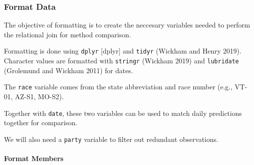 \documentclass[]{article}
\let\oldparagraph\paragraph
\renewcommand{\paragraph}[1]{\oldparagraph{#1}\mbox{}}
\begin{document}
\hypertarget{format-data}{%
\subsubsection{Format Data}\label{format-data}}

The objective of formatting is to create the neccesary variables needed
to perform the relational join for method comparison.

Formatting is done using \texttt{dplyr} {[}dplyr{]} and \texttt{tidyr}
(Wickham and Henry 2019). Character values are formatted with
\texttt{stringr} (Wickham 2019) and \texttt{lubridate} (Grolemund and
Wickham 2011) for dates.

The \texttt{race} variable comes from the state abbreviation and race
number (e.g., VT-01, AZ-S1, MO-S2).

Together with \texttt{date}, these two variables can be used to match
daily predictions together for comparison.

We will also need a \texttt{party} variable to filter out redundant
observations.

\hypertarget{format-members}{%
\paragraph{Format Members}\label{format-members}}
\end{document}
